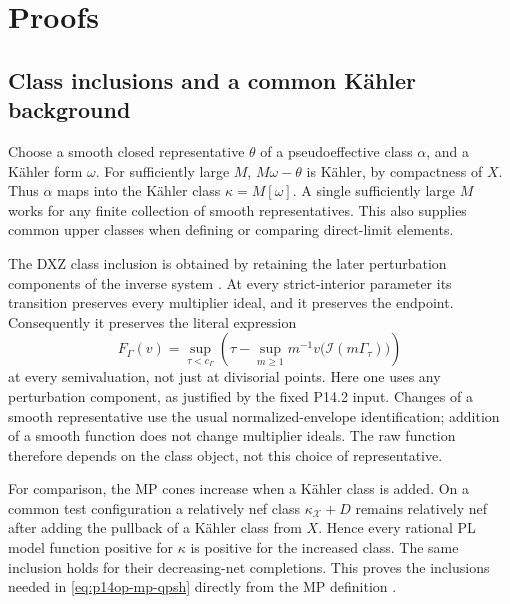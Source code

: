 \section{Proofs}

\subsection{Class inclusions and a common K\"ahler background}

Choose a smooth closed representative \(\theta\) of a pseudoeffective
class \(\alpha\), and a K\"ahler form \(\omega\). For sufficiently
large \(M\), \(M\omega-\theta\) is K\"ahler, by compactness of
\(X\). Thus \(\alpha\) maps into the K\"ahler class
\(\kappa=M[\omega]\). A single sufficiently large \(M\) works
for any finite collection of smooth representatives. This also supplies
common upper classes when defining or comparing direct-limit elements.

The DXZ class inclusion is obtained by retaining the later perturbation
components of the inverse system
\cite[Definition~3.5, Lemma~3.7 and (3.5)]{Xia23}. At every strict-interior
parameter its transition preserves every multiplier ideal, and it preserves
the endpoint. Consequently it preserves the literal expression
\begin{equation}\label{eq:p14op-raw}
 F_\Gamma(v)=\sup_{\tau<c_\Gamma}
 \left(\tau-\sup_{m\geq1}m^{-1}
                 v\bigl(\mathcal I(m\Gamma_\tau)\bigr)\right)
\end{equation}
at every semivaluation, not just at divisorial points. Here one uses any
perturbation component, as justified by the fixed P14.2 input. Changes
of a smooth representative use the usual normalized-envelope
identification; addition of a smooth function does not change multiplier
ideals. The raw function therefore depends on the class object, not this
choice of representative.

For comparison, the MP cones increase when a K\"ahler class is added.
On a common test configuration a relatively nef class
\(\kappa_{\mathcal X}+D\) remains relatively nef after adding
the pullback of a K\"ahler class from \(X\). Hence every rational PL
model function positive for \(\kappa\) is positive for the increased
class. The same inclusion holds for their decreasing-net completions.
This proves the inclusions needed in \eqref{eq:p14op-mp-qpsh} directly
from the MP definition \cite[Section~4.1 and Definition~4.3.1]{MP24}.

